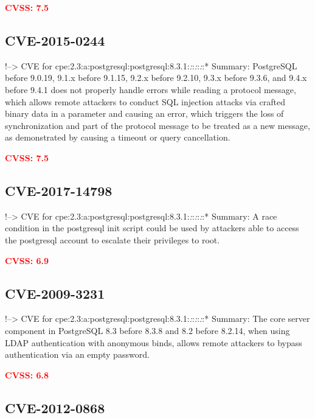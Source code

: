 \documentclass[a4paper, 12pt]{article}
\begin{document}
\textbf{\textcolor{red}{CVSS: 7.5}}

\hypertarget{cve-2015-0244}{%
\subsection{CVE-2015-0244}\label{cve-2015-0244}}

!--\textgreater{} CVE for
cpe:2.3:a:postgresql:postgresql:8.3.1:\emph{:}:\emph{:}:\emph{:}:*
Summary: PostgreSQL before 9.0.19, 9.1.x before 9.1.15, 9.2.x before
9.2.10, 9.3.x before 9.3.6, and 9.4.x before 9.4.1 does not properly
handle errors while reading a protocol message, which allows remote
attackers to conduct SQL injection attacks via crafted binary data in a
parameter and causing an error, which triggers the loss of
synchronization and part of the protocol message to be treated as a new
message, as demonstrated by causing a timeout or query cancellation.

\textbf{\textcolor{red}{CVSS: 7.5}}

\hypertarget{cve-2017-14798}{%
\subsection{CVE-2017-14798}\label{cve-2017-14798}}

!--\textgreater{} CVE for
cpe:2.3:a:postgresql:postgresql:8.3.1:\emph{:}:\emph{:}:\emph{:}:*
Summary: A race condition in the postgresql init script could be used by
attackers able to access the postgresql account to escalate their
privileges to root.

\textbf{\textcolor{red}{CVSS: 6.9}}

\hypertarget{cve-2009-3231}{%
\subsection{CVE-2009-3231}\label{cve-2009-3231}}

!--\textgreater{} CVE for
cpe:2.3:a:postgresql:postgresql:8.3.1:\emph{:}:\emph{:}:\emph{:}:*
Summary: The core server component in PostgreSQL 8.3 before 8.3.8 and
8.2 before 8.2.14, when using LDAP authentication with anonymous binds,
allows remote attackers to bypass authentication via an empty password.

\textbf{\textcolor{red}{CVSS: 6.8}}

\hypertarget{cve-2012-0868}{%
\subsection{CVE-2012-0868}\label{cve-2012-0868}}
\end{document}

